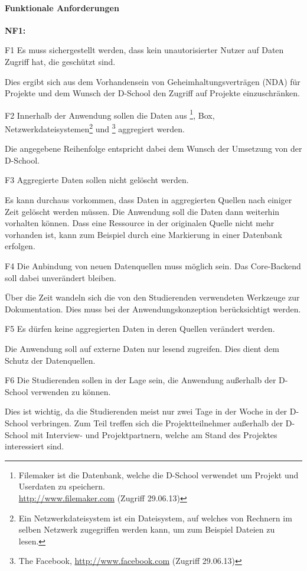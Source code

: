 \paragraph{Funktionale Anforderungen}
\label{sec:functional}
\begin{labeling}{\textbf{NF1:}}
  \item[F1\label{itm:f1}] Es muss sichergestellt werden, dass kein unautorisierter Nutzer auf Daten Zugriff hat, die geschützt sind.

  Dies ergibt sich aus dem Vorhandensein von Geheimhaltungsverträgen (NDA) für Projekte und dem Wunsch der D-School den Zugriff auf Projekte einzuschränken. 

  \item[F2\label{itm:f2}] Innerhalb der Anwendung sollen die Daten aus \footnote{Filemaker ist die Datenbank, welche die D-School verwendet um Projekt und Userdaten zu speichern.\\ \url{http://www.filemaker.com} (Zugriff 29.06.13)}, Box, \gls{Netzwerkdateisystem}en\footnote{Ein \gls{Netzwerkdateisystem} ist ein Dateisystem, auf welches von Rechnern im selben Netzwerk zugegriffen werden kann, um zum Beispiel Dateien zu lesen.} und \footnote{The Facebook, \url{http://www.facebook.com} (Zugriff 29.06.13)} aggregiert werden.

  Die angegebene Reihenfolge entspricht dabei dem Wunsch der Umsetzung von der D-School.
\\ %
  \item[F3\label{itm:f3}] Aggregierte Daten sollen nicht gelöscht werden. 

  Es kann durchaus vorkommen, dass Daten in aggregierten Quellen nach einiger Zeit gelöscht werden müssen. Die Anwendung soll die Daten dann weiterhin vorhalten können. Dass eine \gls{Ressource} in der originalen Quelle nicht mehr vorhanden ist, kann zum Beispiel durch eine Markierung in einer Datenbank erfolgen.

  \item[F4\label{itm:f4}] Die Anbindung von neuen Datenquellen muss möglich sein. Das Core-\gls{Backend} soll dabei unverändert bleiben.

  Über die Zeit wandeln sich die von den Studierenden verwendeten Werkzeuge zur Dokumentation. Dies muss bei der Anwendungskonzeption berücksichtigt werden.

  \item[F5\label{itm:f5}] Es dürfen keine aggregierten Daten in deren Quellen verändert werden.

  Die Anwendung soll auf externe Daten nur lesend zugreifen. Dies dient dem Schutz der Datenquellen.

  \item[F6\label{itm:f6}] Die Studierenden sollen in der Lage sein, die Anwendung außerhalb der D-School verwenden zu können. 

  Dies ist wichtig, da die Studierenden meist nur zwei Tage in der Woche in der D-School verbringen. Zum Teil treffen sich die Projektteilnehmer außerhalb der D-School mit Interview- und Projektpartnern, welche am Stand des Projektes interessiert sind. 
\end{labeling}


